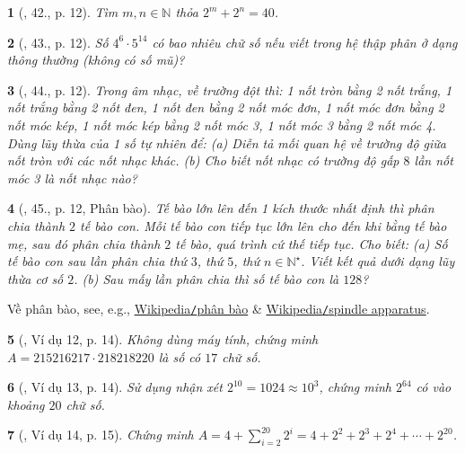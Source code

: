 \documentclass{article}
\newtheorem{baitoan}{}
\begin{document}
\begin{baitoan}[\cite{Tuyen_Toan_6}, 42., p. 12]
	Tìm $m,n\in\mathbb{N}$ thỏa $2^m + 2^n = 40$.
\end{baitoan}

\begin{baitoan}[\cite{Tuyen_Toan_6}, 43., p. 12]
	Số $4^6\cdot5^{14}$ có bao nhiêu chữ số nếu viết trong hệ thập phân ở dạng thông thường (không có số mũ)?
\end{baitoan}

\begin{baitoan}[\cite{Tuyen_Toan_6}, 44., p. 12]
	Trong âm nhạc, về trường đột thì: 1 nốt tròn bằng 2 nốt trắng, 1 nốt trắng bằng 2 nốt đen, 1 nốt đen bằng 2 nốt móc đơn, 1 nốt móc đơn bằng 2 nốt móc kép, 1 nốt móc kép bằng 2 nốt móc 3, 1 nốt móc 3 bằng 2 nốt móc 4. Dùng lũy thừa của 1 số tự nhiên để: (a) Diễn tả mối quan hệ về trường độ giữa nốt tròn với các nốt nhạc khác. (b) Cho biết nốt nhạc có trường độ gấp $8$ lần nốt móc 3 là nốt nhạc nào?
\end{baitoan}

\begin{baitoan}[\cite{Tuyen_Toan_6}, 45., p. 12, Phân bào]
	Tế bào lớn lên đến 1 kích thước nhất định thì phân chia thành $2$ tế bào con. Mỗi tế bào con tiếp tục lớn lên cho đến khi bằng tế bào mẹ, sau đó phân chia thành $2$ tế bào, quá trình cứ thế tiếp tục. Cho biết: (a) Số tế bào con sau lần phân chia thứ $3$, thứ $5$, thứ $n\in\mathbb{N}^\star$. Viết kết quả dưới dạng lũy thừa cơ số $2$. (b) Sau mấy lần phân chia thì số tế bào con là $128$?
\end{baitoan}
Về phân bào, see, e.g., \href{https://vi.wikipedia.org/wiki/Ph%C3%A2n_b%C3%A0o}{Wikipedia{\tt/}phân bào} \& \href{https://en.wikipedia.org/wiki/Spindle_apparatus}{Wikipedia{\tt/}spindle apparatus}.

\begin{baitoan}[\cite{Binh_Toan_6_tap_1}, Ví dụ 12, p. 14]
	Không dùng máy tính, chứng minh $A = 215216217\cdot218218220$ là số có $17$ chữ số.
\end{baitoan}

\begin{baitoan}[\cite{Binh_Toan_6_tap_1}, Ví dụ 13, p. 14]
	Sử dụng nhận xét $2^{10} = 1024\approx10^3$, chứng minh $2^{64}$ có vào khoảng $20$ chữ số.
\end{baitoan}

\begin{baitoan}[\cite{Binh_Toan_6_tap_1}, Ví dụ 14, p. 15]
	Chứng minh $A = 4 + \sum_{i=2}^{20} 2^i = 4 + 2^2 + 2^3 + 2^4 + \cdots + 2^{20}$.
\end{baitoan}
\end{document}
